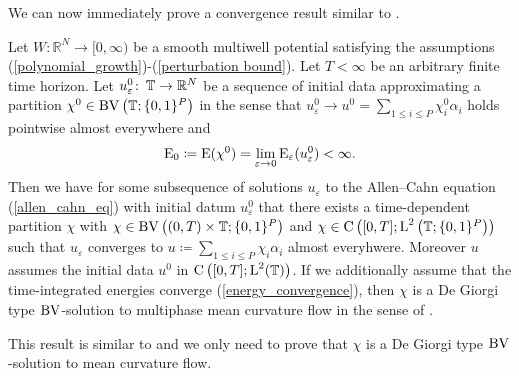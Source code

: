 We can now immediately prove a convergence result similar to
.
\begin{theorem}
	\label{convergence_to_de_giorgis_multiphase_mcf}
	Let $ W \colon \mathbb{ R }^{ N } \to [ 0, 
	\infty ) $ be a smooth multiwell potential satisfying the assumptions 
	(\ref{polynomial_growth})-(\ref{perturbation bound}). Let $ T < \infty 
	$ be an arbitrary finite time horizon. Let 
	$ u_{ \varepsilon }^{ 0 } \colon \operatorname{\mathbb{T}} \to \mathbb{ R }^{ N } $ be a 
	sequence of initial data
	approximating a partition 
	$ \chi^{ 0 } \in \operatorname{BV} \left( \operatorname{\mathbb{T}} ; \{ 0 , 1 \}^{ P } \right) $ 
	in the sense that 
	$ u_{ \varepsilon }^{ 0 } \to u^{ 0 } =  \sum_{ 1 \leq i \leq P } 
	\chi_{ i }^{ 0 } \alpha_{ i } $ 
	holds pointwise almost everywhere and 
	\begin{equation*} 
		\operatorname{E}_{ 0 } 
		\coloneqq 
		\operatorname{E} ( \chi^{ 0 } ) 
		= 
		\lim_{ \varepsilon \to 0 } 
		\operatorname{E}_{ \varepsilon } ( u_{ \varepsilon }^{ 0 } ) 
		< 
		\infty.
	\end{equation*}
	Then we have for 
	some subsequence of solutions $ u_{\varepsilon } $ to the Allen--Cahn 
	equation
	(\ref{allen_cahn_eq})  with initial datum $ u_{ 
		\varepsilon }^{ 0 } $ that there exists a time-dependent partition $ 
		\chi $ 
	with 
	$ \chi \in \operatorname{BV} \left( ( 0 , T ) \times \operatorname{\mathbb{T}} ; \{ 0 , 1 \}^{ P } 
	\right) $ and
	$ \chi 
	\in \operatorname{C} \left( [ 0 , T ] ; \operatorname{L}^{ 2 } \left( \operatorname{\mathbb{T}} ;  \{ 0 , 1 
	\}^{ P } \right) \right) $ such that $ u_{ \varepsilon } $ converges to 
	$ u \coloneqq \sum_{ 1 \leq i \leq P } \chi_{ i } \alpha_{ i } $ almost 
	everyhwere. Moreover $ u $ assumes the initial data $ u^{ 0 } $ in $ 
	\operatorname{C} \left( [ 0, T ] ; \operatorname{L}^{ 2 }( \operatorname{\mathbb{T}} ) \right) $. If we 
	additionally assume that the 
	time-integrated energies converge (\ref{energy_convergence}), then $ 
	\chi $ is a De Giorgi type $ \operatorname{BV} $-solution to multiphase mean curvature 
	flow in the sense 
	of 
	.
\end{theorem} 

This result is similar to  and we only need 
to prove that $ \chi $ is a De Giorgi type $ \operatorname{BV} $-solution to mean curvature 
flow.

